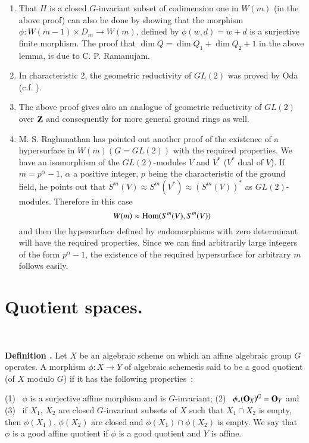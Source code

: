 \begin{remarks*}
\begin{enumerate}
\renewcommand{\labelenumi}{(\theenumi)}
\item That $H$ is a closed $G$-invariant subset of codimension one in $W(m)$ (in the above proof) can also be done by showing that the morphism $\phi:W(m-1)\times D_{m}\to W(m)$, defined by $\phi(w,d)=w+d$ is a surjective finite morphism. The proof that $\dim Q=\dim Q_{1}+\dim Q_{2}+1$ in the above lemma, is due to C. P. Ramanujam.

\item In characteristic 2, the geometric reductivity of $GL(2)$ was proved by Oda (c.f. \cite{art18-key9}).

\item The above proof gives also an analogue of geometric reductivity of $GL(2)$ over $\mathbf{Z}$ and consequently for more general ground rings as well.

\item M. S. Raghunathan has pointed out another proof of the existence of a hypersurface in $W(m)(G=GL(2))$ with the required properties. We have an isomorphism of the $GL(2)$-modules $V$ and $V^{*}$ ($V^{*}$ dual of $V$). If $m=p^{\alpha}-1$, $\alpha$ a positive integer, $p$ being the characteristic of the ground field, he points out that $S^{m}(V)\approx S^{m}(V^{*})\approx (S^{m}(V))^{*}$ as $GL(2)$-modules. Therefore in this case
$$
W(m)\approx \operatorname{\mathrm{Hom}} (S^{m}(V),S^{m}(V))
$$
and then the hypersurface defined by endomorphisms with zero determinant will have the required properties. Since we can find arbitrarily large integers of the form $p^{\alpha}-1$, the existence of the required hypersurface for arbitrary $m$ follows easily.
\end{enumerate}
\end{remarks*}

\section{Quotient spaces.}\label{art18-sec2}

~
\medskip

\noindent
{\bf Definition .\label{art18-defi4}}
Let $X$ be an algebraic scheme on which an affine algebraic group $G$ operates. A morphism $\phi : X\to Y$ of algebraic schemes\pageoriginale is said to be a good quotient (of $X$ modulo $G$) if it has the following properties~:

\smallskip
\noindent
{\rm(1)}~ $\phi$ is a surjective affine morphism and is $G$-invariant; {\rm(2)}~ $\phi_{*}(\mathbf{O}_{X})^{G}=\mathbf{O}_{Y}$ and 
{\rm(3)}~ if $X_{1}$, $X_{2}$ are closed $G$-invariant subsets of $X$ such that $X_{1}\cap X_{2}$ is empty, then $\phi(X_{1})$, $\phi(X_{2})$ are closed and $\phi(X_{1})\cap \phi(X_{2})$ is empty. We say that $\phi$ is a good affine quotient if $\phi$ is a good quotient and $Y$ is affine.
\smallskip

